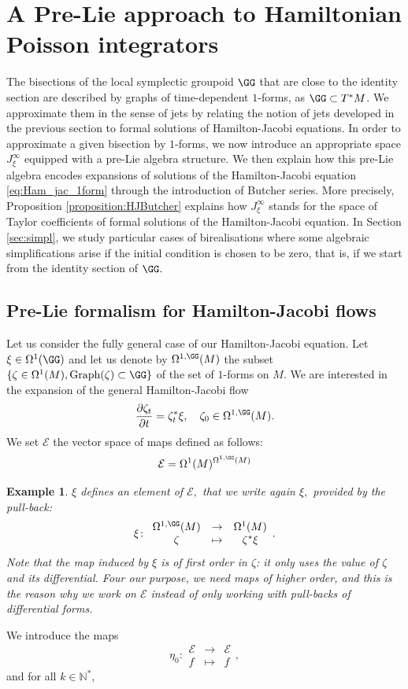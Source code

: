 \documentclass[a4paper,11pt]{article}
\newcommand{\Graph}{\text{Graph}}
\newtheorem{ex}[theorem]{Example}
\begin{document}
\section{A Pre-Lie approach to Hamiltonian Poisson integrators}\label{sec:pre_lie}

The bisections of the local symplectic groupoid $\GG$ that are close to the identity section are described by graphs of time-dependent $1$-forms, as $\GG \subset T^*M$. We approximate them in the sense of jets by relating the notion of jets developed in the previous section to formal solutions of Hamilton-Jacobi equations. In order to approximate a given bisection by $1$-forms, we now introduce an appropriate space $J_\xi^\infty$ equipped with a pre-Lie algebra structure.  We then explain how this pre-Lie algebra encodes expansions of solutions of the Hamilton-Jacobi equation \eqref{eq:Ham_jac_1form} through the introduction of Butcher series. More precisely, Proposition \ref{proposition:HJButcher} explains how $J_\xi^\infty$ stands for the space of Taylor coefficients of formal solutions of the Hamilton-Jacobi equation.  In Section \ref{sec:simpl}, we study particular cases of birealisations where some algebraic simplifications arise if the initial condition is chosen to be zero, that is, if we start from the identity section of $\GG.$


\subsection{Pre-Lie formalism for Hamilton-Jacobi flows}

Let us consider the fully general case of our Hamilton-Jacobi equation. Let $\xi\in \Omega^1(\GG)$ and let us denote by $\Omega^{1, \GG}(M)$ the subset $\{ \zeta \in \Omega^1(M), \Graph(\zeta) \subset \GG \}$ of the set of $1$-forms on $M.$ We are interested in the expansion of the general Hamilton-Jacobi flow
\begin{equation}
\label{equation:general_HJ}
\frac{\partial\zeta_t}{\partial t}=\zeta_t^*\xi,\quad \zeta_0\in \Omega^{1, \GG}(M).
\end{equation}
We set $\mathcal{E}$ the vector space of maps defined as follows:
\[
	\mathcal{E} = \Omega^1(M)^{ \Omega^{1, \GG}(M)}
\]

\begin{ex}
$\xi$ defines an element of $\mathcal{E},$ that we write again $\xi,$ provided by the pull-back:
\[
\xi \colon \begin{array}{ccc}
\Omega^{1, \GG}(M) & \to & \Omega^1(M)\\
\zeta & \mapsto & \zeta^*\xi
\end{array}.
\]
Note that the map induced by $\xi$ is of first order in $\zeta$: it only uses the value of $\zeta$ and its differential. Four our purpose, we need maps of higher order, and this is the reason why we work on $\mathcal{E}$ instead of only working with pull-backs of differential forms.
\end{ex}
We introduce the maps
\[
\eta_{0} \colon
\begin{array}{ccc}
\mathcal{E} & \to & \mathcal{E}\\
f & \mapsto & f
\end{array},
\]
and for all $k \in \mathbb{N}^*,$
\end{document}
